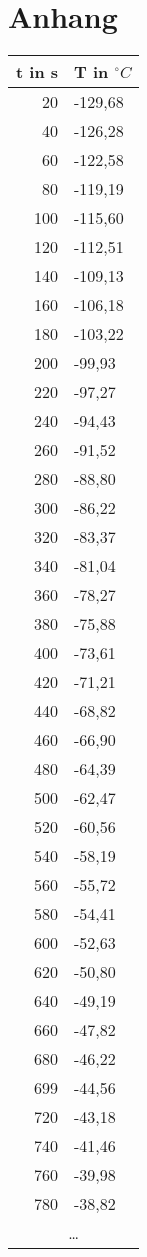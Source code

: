 \section{Anhang}
\nopagebreak
\begin{table}[h]
\scriptsize
\centering
\begin{tabular}{rl}
t in s & T in $^{\circ}C$\\
\toprule
20	&	-129,68\\
40	&	-126,28\\
60	&	-122,58\\
80	&	-119,19\\
100	&	-115,60\\
120	&	-112,51\\
140	&	-109,13\\
160	&	-106,18\\
180	&	-103,22\\
200	&	-99,93\\
220	&	-97,27\\
240	&	-94,43\\
260	&	-91,52\\
280	&	-88,80\\
300	&	-86,22\\
320	&	-83,37\\
340	&	-81,04\\
360	&	-78,27\\
380	&	-75,88\\
400	&	-73,61\\
420	&	-71,21\\
440	&	-68,82\\
460	&	-66,90\\
480	&	-64,39\\
500	&	-62,47\\
520	&	-60,56\\
540	&	-58,19\\
560	&	-55,72\\
580	&	-54,41\\
600	&	-52,63\\
620	&	-50,80\\
640	&	-49,19\\
660	&	-47,82\\
680	&	-46,22\\
699	&	-44,56\\
720	&	-43,18\\
740	&	-41,46\\
760	&	-39,98\\
780	&	-38,82\\
\multicolumn{2}{c}{\dots}\\

\end{tabular}
\end{table}
